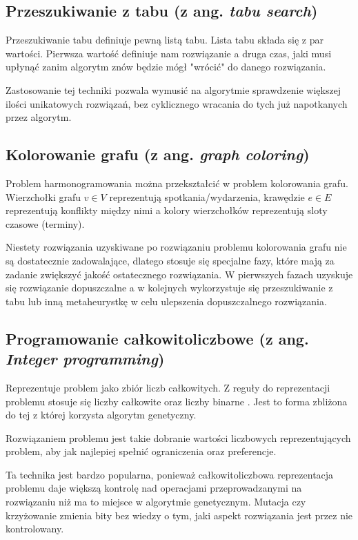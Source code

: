 \subsection{Przeszukiwanie z tabu (z ang. \emph{tabu search})}
Przeszukiwanie tabu definiuje pewną listą tabu. Lista tabu składa się z par
wartości. Pierwsza wartość definiuje nam rozwiązanie a druga czas, jaki musi
upłynąć zanim algorytm znów będzie mógł "wrócić" do danego rozwiązania.

Zastosowanie tej techniki pozwala wymusić na algorytmie sprawdzenie większej
ilości unikatowych rozwiązań, bez cyklicznego wracania do tych już napotkanych
przez algorytm.

\subsection{Kolorowanie grafu (z ang. \emph{graph coloring})}
Problem harmonogramowania można przekształcić w problem kolorowania grafu\cite{haan2006}.
Wierzchołki grafu $v \in V$ reprezentują spotkania/wydarzenia, krawędzie
$e \in E$ reprezentują konflikty między nimi a kolory wierzchołków reprezentują sloty czasowe
(terminy). 

Niestety rozwiązania uzyskiwane po rozwiązaniu problemu kolorowania grafu nie są
dostatecznie zadowalające\cite{hann2006}, dlatego stosuje się specjalne fazy, 
które mają za zadanie zwiększyć jakość ostatecznego rozwiązania. W pierwszych
fazach uzyskuje się rozwiązanie dopuszczalne a w kolejnych wykorzystuje się
przeszukiwanie z tabu lub inną metaheurystkę w celu ulepszenia dopuszczalnego
rozwiązania.

\subsection{Programowanie całkowitoliczbowe (z ang. \emph{Integer programming})}
Reprezentuje problem jako zbiór liczb całkowitych. Z reguły do reprezentacji
problemu stosuje się liczby całkowite oraz liczby binarne
\cite{maaroufi2016mixed}. Jest to forma zbliżona do tej z której korzysta algorytm genetyczny.

Rozwiązaniem problemu jest takie dobranie wartości liczbowych reprezentujących
problem, aby jak najlepiej spełnić ograniczenia oraz preferencje.

Ta technika jest bardzo popularna, ponieważ całkowitoliczbowa reprezentacja problemu daje
większą kontrolę nad operacjami przeprowadzanymi na rozwiązaniu niż ma to miejsce w algorytmie
genetycznym. Mutacja czy krzyżowanie zmienia bity bez wiedzy o tym, jaki aspekt
rozwiązania jest przez nie kontrolowany.

